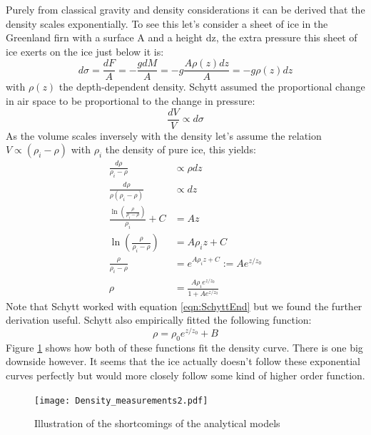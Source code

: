 Purely from classical gravity and density considerations it can be derived that
the density scales exponentially. To see this let's consider a sheet of ice in
the Greenland firn with a surface A and a height dz, the extra pressure this
sheet of ice exerts on the ice just below it is:
\begin{equation}
	d\sigma = \frac{dF}{A} = -\frac{gdM}{A} = -g\frac{A\rho(z)dz}{A} = -g\rho(z)dz
\end{equation}
with $\rho(z)$ the depth-dependent density. Schytt assumed the
proportional change in air space to be proportional to the change in
pressure:
\begin{equation}
	\frac{dV}{V} \propto d\sigma
\end{equation}
As the volume scales inversely with the density let's assume the relation $V \propto (\rho_i - \rho)$ with
$\rho_i$ the density of pure ice, this yields\cite{herron_langway_1980}:
\begin{align}
	\frac{d\rho}{\rho_i - \rho} &\propto \rho dz\\
	\frac{d\rho}{\rho(\rho_i - \rho)} &\propto dz \label{eqn:SchyttEnd}\\
	\frac{\ln\left(\frac{\rho}{\rho_i-\rho}\right)}{\rho_i} + C &= Az\\
	\ln\left(\frac{\rho}{\rho_i-\rho}\right) &= A\rho_iz + C\\
	\frac{\rho}{\rho_i-\rho} &= e^{A\rho_iz + C} := Ae^{z/z_0}\\
	\rho &= \frac{A\rho_i e^{z/z_0}}{1 + Ae^{z/z_0}}
\end{align}
Note that Schytt worked with equation \ref{eqn:SchyttEnd} but we found
the further derivation useful. Schytt also empirically fitted the
following function:
\begin{equation}
	\label{eqn:myderiexp}
	\rho = \rho_0 e^{z/z_0} + B
\end{equation}
Figure \ref{fig:DensityMeasurements} shows how both of these
functions fit the density curve.  There is one big downside however.
It seems that the ice actually doesn't follow these exponential
curves perfectly but would more closely follow some kind of higher
order function.
\begin{figure}
  \centering
	\texttt{[image: Density\_measurements2.pdf]}
	\caption{Illustration of the shortcomings of the analytical models}
	\label{fig:DensityMeasurements}
\end{figure}

